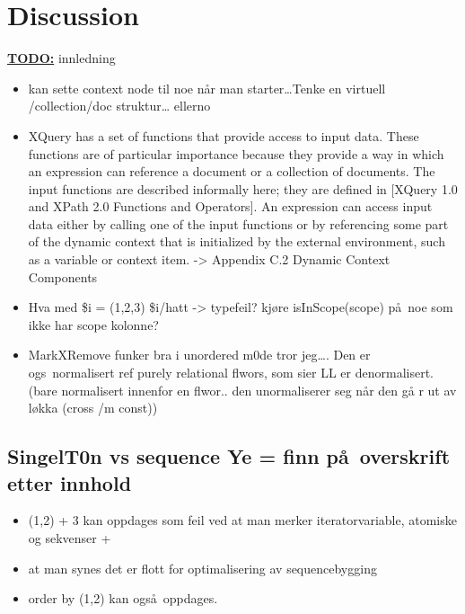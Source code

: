 \chapter{Discussion}
\label{chapter:discussion}

\textbf{\underline{\LARGE TODO:}} innledning

\begin{itemize}
  
  \item kan sette context node til noe n\aa r man starter\ldots Tenke en virtuell /collection/doc struktur\ldots
  ellerno
  \item XQuery has a set of functions that provide access to input data. These functions are of particular
  importance because they provide a way in which an expression can reference a document or a collection of
  documents. The input functions are described informally here; they are defined in [XQuery 1.0 and XPath 2.0
  Functions and Operators]. An expression can access input data either by calling one of the input functions or by
  referencing some part of the dynamic context that is initialized by the external environment, such as a variable
  or context item. -> Appendix C.2 Dynamic Context Components
	\item Hva med \$i = (1,2,3) \$i/hatt -> typefeil? kj\o re isInScope(scope) p\aa~noe som ikke har scope kolonne?
	\item MarkXRemove funker bra i unordered m0de tror jeg\ldots. Den er ogs\a~normalisert ref purely relational
	flwors, som sier LL er denormalisert. (bare normalisert innenfor en flwor.. den unormaliserer seg n\aa r den g\aa
	r ut av l\o kka (cross /m const))
\end{itemize}

\section{SingelT0n vs sequence Ye = finn p\aa~overskrift etter innhold}
\label{sect:disc:singelton}
\begin{itemize}
   \item (1,2) + 3 kan oppdages som feil ved at man merker iteratorvariable, atomiske og sekvenser + 
   \item at man synes det er flott for optimalisering av sequencebygging 
   \item order by (1,2) kan ogs\aa~oppdages. 
\end{itemize}

